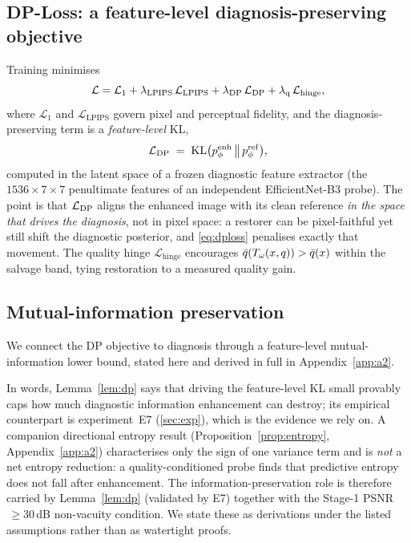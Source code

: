 \subsection{DP-Loss: a feature-level diagnosis-preserving objective}\label{sec:dploss}
Training minimises
\begin{equation}
\mathcal{L}=\mathcal{L}_1
  +\lambda_{\mathrm{LPIPS}}\,\mathcal{L}_{\mathrm{LPIPS}}
  +\lambda_{\mathrm{DP}}\,\mathcal{L}_{\mathrm{DP}}
  +\lambda_{\mathrm{q}}\,\mathcal{L}_{\mathrm{hinge}},
\label{eq:total-loss}
\end{equation}
where $\mathcal{L}_1$ and $\mathcal{L}_{\mathrm{LPIPS}}$ govern pixel and perceptual fidelity, and the
diagnosis-preserving term is a \emph{feature-level} KL,
\begin{equation}
\mathcal{L}_{\mathrm{DP}} \;=\; \operatorname{KL}\!\big(p_\phi^{\mathrm{enh}} \,\big\|\, p_\phi^{\mathrm{ref}}\big),
\label{eq:dploss}
\end{equation}
computed in the latent space of a frozen diagnostic feature extractor (the $1536\times7\times7$
penultimate features of an independent EfficientNet-B3 probe). The point is that $\mathcal{L}_{\mathrm{DP}}$ aligns the
enhanced image with its clean reference \emph{in the space that drives the diagnosis}, not in pixel
space: a restorer can be pixel-faithful yet still shift the diagnostic posterior, and \eqref{eq:dploss}
penalises exactly that movement. The quality hinge $\mathcal{L}_{\mathrm{hinge}}$ encourages
$\bar{q}(T_\omega(x,q))>\bar{q}(x)$ within the salvage band, tying restoration to a measured quality gain.

\subsection{Mutual-information preservation}\label{sec:prop3lemma3}
We connect the DP objective to diagnosis through a feature-level mutual-information lower bound, stated
here and derived in full in Appendix~\ref{app:a2}.

In words, Lemma~\ref{lem:dp} says that driving the feature-level KL small provably caps how much
diagnostic information enhancement can destroy; its empirical counterpart is experiment~E7
(\cref{sec:exp}), which is the evidence we rely on. A companion directional entropy result
(Proposition~\ref{prop:entropy}, Appendix~\ref{app:a2}) characterises only the sign of one variance
term and is \emph{not} a net entropy reduction: a quality-conditioned probe finds that predictive
entropy does not fall after enhancement. The information-preservation role is therefore carried by
Lemma~\ref{lem:dp} (validated by E7) together with the Stage-1 PSNR$\,\geq30$\,dB non-vacuity
condition. We state these as derivations under the listed assumptions rather than as watertight proofs.

